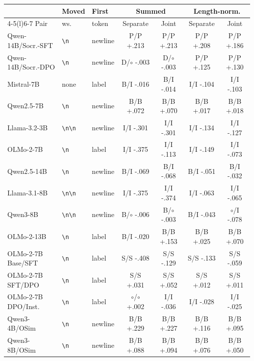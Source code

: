 \begin{table}[t]
\centering\scriptsize
\setlength{\tabcolsep}{2.5pt}
\begin{tabular}{@{}lllcccc@{}}
\toprule
& Moved & First & \multicolumn{2}{c}{Summed} & \multicolumn{2}{c}{Length-norm.} \\
\cmidrule(lr){4-5}\cmidrule(l){6-7}
Pair & ws. & token & Separate & Joint & Separate & Joint \\
\midrule
Qwen-14B/Socr.-SFT & \texttt{\textbackslash n} & newline & P/P +.213 & P/P +.213 & P/P +.208 & P/P +.186 \\
Qwen-14B/Socr.-DPO & \texttt{\textbackslash n} & newline & D/$\circ$ -.003 & D/$\circ$ -.003 & P/P +.125 & P/P +.130 \\
\addlinespace[2pt]
Mistral-7B & none & label & B/I -.016 & B/I -.014 & I/I -.104 & I/I -.103 \\
Qwen2.5-7B & \texttt{\textbackslash n} & newline & B/B +.072 & B/B +.070 & B/B +.017 & B/B +.018 \\
Llama-3.2-3B & \texttt{\textbackslash n\textbackslash n} & newline & I/I -.301 & I/I -.301 & I/I -.134 & I/I -.127 \\
OLMo-2-7B & \texttt{\textbackslash n} & label & I/I -.375 & I/I -.113 & I/I -.149 & I/I -.073 \\
\addlinespace[2pt]
Qwen2.5-14B & \texttt{\textbackslash n} & newline & B/I -.069 & B/I -.068 & B/I -.051 & B/I -.032 \\
Llama-3.1-8B & \texttt{\textbackslash n\textbackslash n} & newline & I/I -.375 & I/I -.374 & I/I -.063 & I/I -.065 \\
Qwen3-8B & \texttt{\textbackslash n\textbackslash n} & newline & B/$\circ$ -.006 & B/$\circ$ -.003 & B/I -.043 & $\circ$/I -.078 \\
OLMo-2-13B & \texttt{\textbackslash n} & label & B/I -.020 & B/B +.153 & B/B +.025 & B/B +.070 \\
\addlinespace[2pt]
OLMo-2-7B Base/SFT & \texttt{\textbackslash n} & label & S/S -.408 & S/S -.129 & S/S -.133 & S/S -.059 \\
OLMo-2-7B SFT/DPO & \texttt{\textbackslash n} & label & S/S +.031 & S/S +.052 & S/S +.012 & S/S +.011 \\
OLMo-2-7B DPO/Inst. & \texttt{\textbackslash n} & label & $\circ$/$\circ$ +.002 & I/I -.036 & I/I -.028 & I/I -.025 \\
\addlinespace[2pt]
Qwen3-4B/OSim & \texttt{\textbackslash n} & newline & B/B +.229 & B/B +.227 & B/B +.116 & B/B +.095 \\
Qwen3-8B/OSim & \texttt{\textbackslash n} & newline & B/B +.088 & B/B +.094 & B/B +.076 & B/B +.050 \\

\end{tabular}
\end{table}
